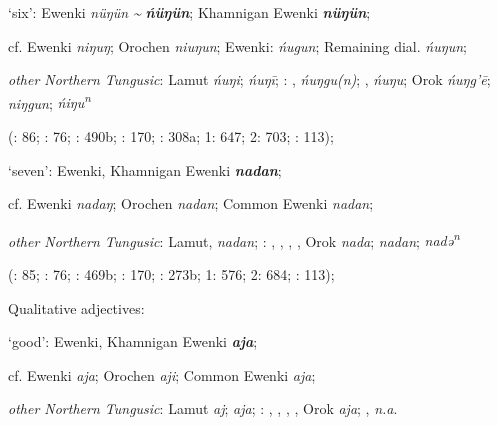 \documentclass[output=paper,colorlinks,citecolor=brown]{langscibook}
\begin{document}
\begin{xlist}
\begin{xlist}
    \ex ‘six’:  Ewenki \textit{nüŋün {\textasciitilde}} \textbf{\textit{ńüŋün}}; Khamnigan Ewenki \textbf{\textit{nüŋün}};

    cf.  Ewenki \textit{niŋuŋ}; Orochen \textit{niuŋun};  Ewenki:  \textit{ńugun}; Remaining dial. \textit{ńuŋun};

    \textit{other Northern Tungusic}: Lamut \textit{ńuŋi};  \textit{ńuŋī}; \textit{}: ,  \textit{ńuŋgu(n)}; ,  \textit{ńuŋu}; Orok \textit{ńuŋg’ē};  \textit{niŋgun};  \textit{ńiŋu\textsuperscript{n}} 
    
    (\citealt{Castrén1856}: 86; \citealt{Janhunen1991}: 76; \citealt{Dorji1998}: 490b; \citealt{Chaoke2014a}: 170; \citealt{Vasilevic1958}: 308a; \citealt{Cincius1975B} 1: 647; \citealt{Hauer1952} 2: 703; \citealt{Zikmundová2013a}: 113);

    \ex ‘seven’:  Ewenki, Khamnigan Ewenki \textbf{\textit{nadan}};

    cf.  Ewenki \textit{nadaŋ}; Orochen \textit{nadan};  Common Ewenki \textit{nadan};

    \textit{other Northern Tungusic}: Lamut,  \textit{nadan}; \textit{}: , , , , Orok \textit{nada};  \textit{nadan};  \textit{nadǝ\textsuperscript{n}}
    
    (\citealt{Castrén1856}: 85; \citealt{Janhunen1991}: 76; \citealt{Dorji1998}: 469b; \citealt{Chaoke2014a}: 170; \citealt{Vasilevic1958}: 273b; \citealt{Cincius1975B} 1: 576; \citealt{Hauer1952} 2: 684; \citealt{Zikmundová2013a}: 113);
\end{xlist}


    \ex Qualitative adjectives:

\begin{xlist}
    \ex ‘good’:  Ewenki, Khamnigan Ewenki \textbf{\textit{aja}};

    cf.  Ewenki \textit{aja}; Orochen \textit{aji};  Common Ewenki \textit{aja};

    \textit{other Northern Tungusic}: Lamut \textit{aj};  \textit{aja}; \textit{}: , , , , Orok \textit{aja}; ,  \textit{n.a}.
    

\end{xlist}
\end{xlist}
\end{document}
